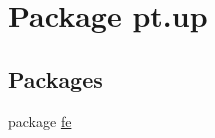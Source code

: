 \hypertarget{namespacept_1_1up}{}\section{Package pt.\+up}
\label{namespacept_1_1up}
\subsection*{Packages}
\begin{DoxyCompactItemize}
\item 
package \hyperlink{namespacept_1_1up_1_1fe}{fe}
\end{DoxyCompactItemize}
